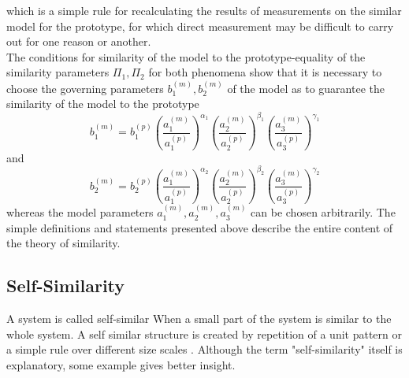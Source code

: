 	which is a simple rule for recalculating the results of measurements on the similar model for the prototype, for which direct measurement may be difficult to carry out for one reason or another.\\
	The conditions for similarity of the model to the prototype-equality of the similarity parameters $\Pi_1, \Pi_2$ for both phenomena show that it is necessary to choose the governing parameters $b_1^{(m)}, b_2^{(m)}$ of the model as to guarantee the similarity of the model to the prototype
	\begin{equation}
		b_1^{(m)} = b_1^{(p)} \left(\frac{a_1^{(m)}}{a_1^{(p)}}\right)^{\alpha_1}
		\left(\frac{a_2^{(m)}}{a_2^{(p)}}\right)^{\beta_1}
		\left(\frac{a_3^{(m)}}{a_3^{(p)}}\right)^{\gamma_1}
	\end{equation}
	and 
		\begin{equation}
	b_2^{(m)} = b_2^{(p)} \left(\frac{a_1^{(m)}}{a_1^{(p)}}\right)^{\alpha_2}
	\left(\frac{a_2^{(m)}}{a_2^{(p)}}\right)^{\beta_2}
	\left(\frac{a_3^{(m)}}{a_3^{(p)}}\right)^{\gamma_2}
	\end{equation}
	whereas the model parameters $a_1^{(m)}, a_2^{(m)}, a_3^{(m)}$ can be chosen arbitrarily. The simple definitions and statements presented above describe the entire content of the theory of similarity.
	
	
	\subsection{Self-Similarity}
	A system is called self-similar	When a small part of the system is similar to the whole system. A self similar structure is created by repetition of a unit pattern or a simple rule over different size scales \cite{Mandelbrot1983}. Although the term "self-similarity" itself is explanatory, some example gives better insight.
	
